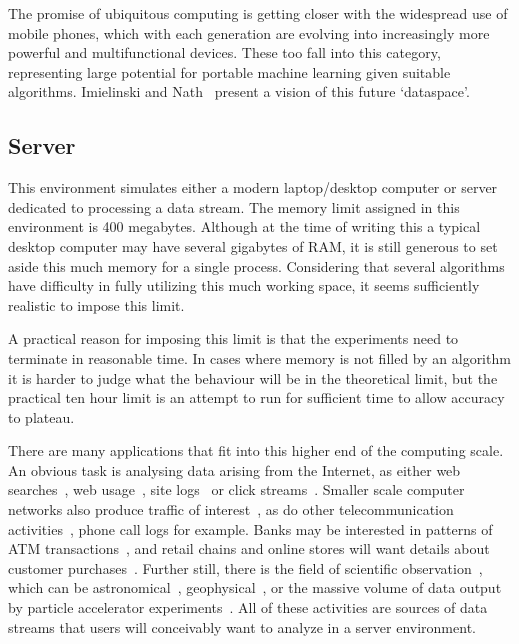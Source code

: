 The promise of ubiquitous computing is getting closer with the widespread use of mobile phones, which with each generation are evolving into increasingly more powerful and multifunctional devices. These too fall into this category, representing large potential for portable machine learning given suitable algorithms. Imielinski and Nath~\cite{wirelessgraffiti} present a vision of this future `dataspace'.

\subsection{Server}
\label{sec:server}

This environment simulates either a modern laptop/desktop computer or server dedicated to processing a data stream. The memory limit assigned in this environment is 400 megabytes. Although at the time of writing this \thesis a typical desktop computer may have several gigabytes of RAM, it is still generous to set aside this much memory for a single process. Considering that several algorithms have difficulty in fully utilizing this much working space, it seems sufficiently realistic to impose this limit.

A practical reason for imposing this limit is that the experiments need to terminate in reasonable time. In cases where memory is not filled by an algorithm it is harder to judge what the behaviour will be in the theoretical limit, but the practical ten hour limit is an attempt to run for sufficient time to allow accuracy to plateau.

There are many applications that fit into this higher end of the computing scale. An obvious task is analysing data arising from the Internet, as either web searches~\cite{webmine}, web usage~\cite{webusage}, site logs~\cite{weblogs} or click streams~\cite{clickstreams}. Smaller scale computer networks also produce traffic of interest~\cite{minenetwork}, as do other telecommunication activities~\cite{telecommunications}, phone call logs for example. Banks may be interested in patterns of ATM transactions~\cite{minebank}, and retail chains and online stores will want details about customer purchases~\cite{ecommerceapp}. Further still, there is the field of scientific observation~\cite{minescientific}, which can be astronomical~\cite{astronomical}, geophysical~\cite{geophysical}, or the massive volume of data output by particle accelerator experiments~\cite{particleaccelerator}. All of these activities are sources of data streams that users will conceivably want to analyze in a server environment.

